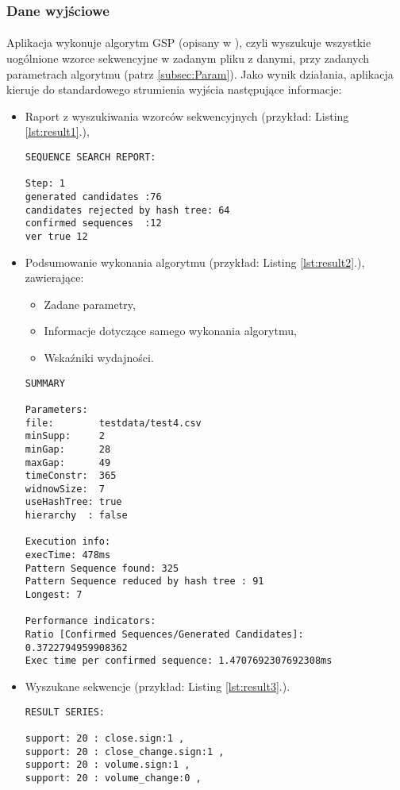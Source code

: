 \documentclass[11pt,a4paper]{article}
\begin{document}
\subsubsection{Dane wyjściowe}
\paragraph{} Aplikacja wykonuje algorytm GSP (opisany w \cite{bib:GSP}), czyli wyszukuje wszystkie uogólnione wzorce sekwencyjne w zadanym pliku z danymi, przy zadanych parametrach algorytmu (patrz \ref{subsec:Param}). Jako wynik działania, aplikacja kieruje do standardowego strumienia wyjścia następujące informacje:
\begin{itemize}
\item Raport z wyszukiwania wzorców sekwencyjnych (przykład: Listing \ref{lst:result1}.),
\begin{lstlisting}[caption={Raport z wyszukiwania},label={lst:result1}]
SEQUENCE SEARCH REPORT:

Step: 1
generated candidates :76
candidates rejected by hash tree: 64
confirmed sequences  :12
ver true 12
\end{lstlisting}
\newpage
\item Podsumowanie wykonania algorytmu (przykład: Listing \ref{lst:result2}.), zawierające:
\begin{itemize}
\item Zadane parametry,
\item Informacje dotyczące samego wykonania algorytmu,
\item Wskaźniki wydajności.
\end{itemize}
\begin{lstlisting}[caption={Podsumowanie},label={lst:result2}]
SUMMARY

Parameters:
file:        testdata/test4.csv
minSupp:     2
minGap:      28
maxGap:      49
timeConstr:  365
widnowSize:  7
useHashTree: true
hierarchy  : false

Execution info:
execTime: 478ms
Pattern Sequence found: 325
Pattern Sequence reduced by hash tree : 91
Longest: 7

Performance indicators:
Ratio [Confirmed Sequences/Generated Candidates]: 0.3722794959908362
Exec time per confirmed sequence: 1.4707692307692308ms
\end{lstlisting}
\item Wyszukane sekwencje (przykład: Listing \ref{lst:result3}.).
\begin{lstlisting}[caption={Wyszukane sekwencje},label={lst:result3}]
RESULT SERIES:

support: 20 : close.sign:1 , 
support: 20 : close_change.sign:1 , 
support: 20 : volume.sign:1 , 
support: 20 : volume_change:0 , 
\end{lstlisting}
\end{itemize}
\end{document}
